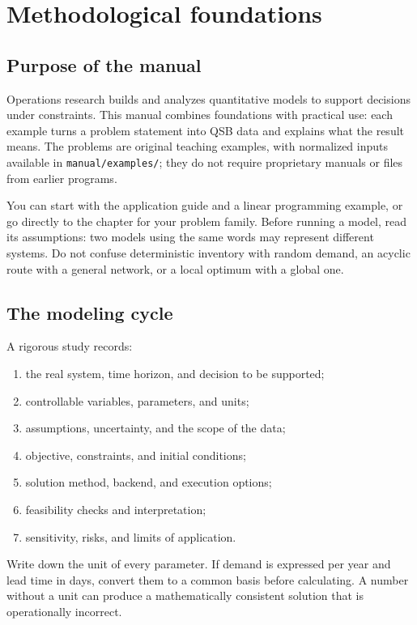 \chapter{Methodological foundations}
\label{chap:preliminares}

\section{Purpose of the manual}
Operations research builds and analyzes quantitative models to support decisions
under constraints. This manual combines foundations with practical use: each
example turns a problem statement into QSB data and explains what the result
means. The problems are original teaching examples, with normalized inputs
available in \texttt{manual/examples/}; they do not require proprietary manuals
or files from earlier programs.

You can start with the application guide and a linear programming example, or
go directly to the chapter for your problem family. Before running a model,
read its assumptions: two models using the same words may represent different
systems. Do not confuse deterministic inventory with random demand, an acyclic
route with a general network, or a local optimum with a global one.

\section{The modeling cycle}
A rigorous study records:
\begin{enumerate}
 \item the real system, time horizon, and decision to be supported;
 \item controllable variables, parameters, and units;
 \item assumptions, uncertainty, and the scope of the data;
 \item objective, constraints, and initial conditions;
 \item solution method, backend, and execution options;
 \item feasibility checks and interpretation;
 \item sensitivity, risks, and limits of application.
\end{enumerate}
Write down the unit of every parameter. If demand is expressed per year and
lead time in days, convert them to a common basis before calculating. A number
without a unit can produce a mathematically consistent solution that is
operationally incorrect.

